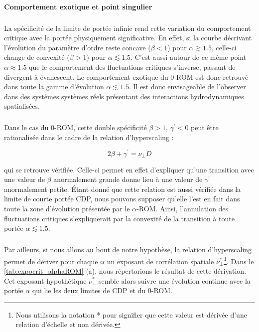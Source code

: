 \paragraph{Comportement exotique et point singulier}

\subparagraph{}La spécificité de la limite de portée infinie rend cette variation du comportement critique avec la portée physiquement significative. En effet, si la courbe décrivant l'évolution du paramètre d'ordre reste concave ($\beta < 1$) pour $\alpha \gtrsim 1.5$, celle-ci change de convexité ($\beta >1$) pour $\alpha \lesssim 1.5$. C'est aussi autour de ce même point $\alpha \approx 1.5$ que le comportement des fluctuations critiques s'inverse, passant de divergent à évanescent. Le comportement exotique du 0-ROM est donc retrouvé dans toute la gamme d'évolution $\alpha \lesssim 1.5$. Il est donc envisageable de l'observer dans des systèmes systèmes réels présentant des interactions hydrodynamiques spatialisées.

\subparagraph{}Dans le cas du 0-ROM, cette double spécificité $\beta>1$, $\gamma^\prime<0$ peut être rationalisée dans le cadre de la relation d'hyperscaling \cite{lubeck_universal_2004} \cite{mari_absorbing_2022} :

\begin{equation}
	2\beta + \gamma^\prime = \nu_\perp D
\end{equation}

\noindent qui se retrouve vérifiée. Celle-ci permet en effet d'expliquer qu'une transition avec une valeur de $\beta$ anormalement grande donne lieu à une valeur de $\gamma^\prime$ anormalement petite. Étant donné que cette relation est aussi vérifiée dans la limite de courte portée CDP, nous pouvons supposer qu'elle l'est en fait dans toute la zone d'évolution présentée par le $\alpha$-ROM. Ainsi, l'annulation des fluctuations critiques s'expliquerait par la convexité de la transition à toute portée $\alpha \lesssim 1.5$.

\subparagraph{}Par ailleurs, si nous allons au bout de notre hypothèse, la relation d'hyperscaling permet de dériver pour chaque $\alpha$ un exposant de corrélation spatiale $\nu_\perp^*$\footnote{Nous utilisons la notation * pour signifier que cette valeur est dérivée d'une relation d'échelle et non dérivée.}. Dans le \autoref{tab:expocrit_alphaROM}-(a), nous répertorions le résultat de cette dérivation. Cet exposant hypothétique $\nu_\perp^*$ semble alors suivre une évolution continue avec la portée $\alpha$ qui lie les deux limites de CDP et du 0-ROM.

